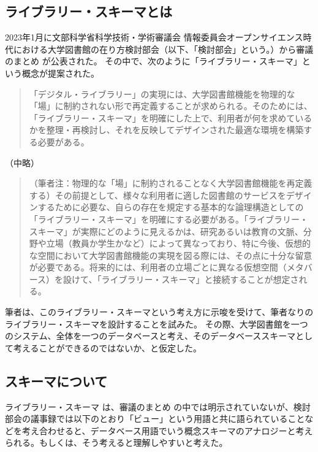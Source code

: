 \documentclass[submit,noauthor]{ono}
\begin{document}
\subsection{ライブラリー・スキーマとは}

2023年1月に文部科学省科学技術・学術審議会 情報委員会オープンサイエンス時代における大学図書館の在り方検討部会（以下、「検討部会」という。）から審議のまとめ\cite{まとめ} が公表された。
その中で、次のように「ライブラリー・スキーマ」という概念が提案された。

\begin{quote}
	「デジタル・ライブラリー」の実現には、大学図書館機能を物理的な「場」に制約されない形で再定義することが求められる。そのためには、「ライブラリー・スキーマ」を明確にした上で、利用者が何を求めているかを整理・再検討し、それを反映してデザインされた最適な環境を構築する必要がある。
\end{quote}

（中略）

\begin{quote}
	（筆者注：物理的な「場」に制約されることなく大学図書館機能を再定義する）その前提として、様々な利用者に適した図書館のサービスをデザインするために必要な、自らの存在を規定する基本的な論理構造としての「ライブラリー・スキーマ」を明確にする必要がある。「ライブラリー・スキーマ」が実際にどのように見えるかは、研究あるいは教育の文脈、分野や立場（教員か学生かなど）によって異なっており、特に今後、仮想的な空間において大学図書館機能の実現を図る際には、その点に十分な留意が必要である。将来的には、利用者の立場ごとに異なる仮想空間（メタバース）を設けて、「ライブラリー・スキーマ」と接続することが想定される。
\end{quote}

筆者は、このライブラリー・スキーマという考え方に示唆を受けて、筆者なりのライブラリー・スキーマを設計することを試みた。
その際、大学図書館を一つのシステム、全体を一つのデータベースと考え、そのデータベーススキーマとして考えることができるのではないか、と仮定した。

	\subsection{スキーマについて}

	ライブラリー・スキーマ は、審議のまとめ\cite{まとめ} の中では明示されていないが、検討部会の議事録\cite{議事録}では以下のとおり「ビュー」という用語と共に語られていることなどを考え合わせると、データベース用語でいう概念スキーマのアナロジーと考えられる。もしくは、そう考えると理解しやすいと考えた。
\end{document}
